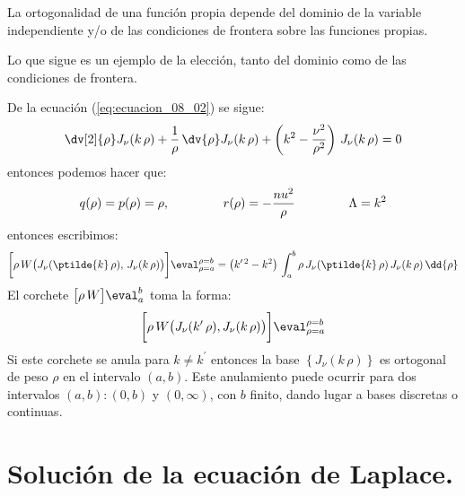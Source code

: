 La ortogonalidad de una función propia depende del dominio de la variable independiente y/o de las condiciones de frontera sobre las funciones propias.
\par
Lo que sigue es un ejemplo de la elección, tanto del dominio como de las condiciones de frontera.
\par
De la ecuación (\ref{eq:ecuacion_08_02}) se sigue:
\begin{align*}
\dv[2]{\rho} J_{\nu} (k \, \rho) + \dfrac{1}{\rho} \, \dv{\rho} J_{\nu} (k \, \rho) + \left( k^{2} - \dfrac{\nu^{2}}{\rho^{2}} \right) \, J_{\nu} (k \, \rho) = 0
\end{align*}
entonces podemos hacer que:
\begin{align*}
q(\rho) = p(\rho) = \rho, \hspace{1.5cm} r(\rho) = -\dfrac{nu^{2}}{\rho} \hspace{1.5cm} \Lambda = k^{2}
\end{align*}
entonces escribimos:
\begin{align}
\bigg[ \rho \, W \big( J_{\nu}(\ptilde{k} \, \rho), \, J_{\nu} (k \, \rho) \big) \bigg]\eval_{\rho=a}^{\rho=b} = \big( k^{\prime \, 2} - k^{2} \big) \, \int_{a}^{b} \rho \, J_{\nu}(\ptilde{k} \, \rho) \, J_{\nu} (k \, \rho) \, \dd{\rho}
\label{eq:ecuacion_08_12}
\end{align}
El corchete $\big[ \rho \, W \big]\eval_{a}^{b}$ toma la forma:
\begin{align*}
\bigg[ \rho \, W \big( J_{\nu}(k^{\prime} \, \rho), J_{\nu} (k \, \rho) \big) \bigg]\eval_{\rho=a}^{\rho=b}
\end{align*}
Si este corchete se anula para $k \neq k^{\prime}$ entonces la base $\left\{ J_{\nu} (k \, \rho) \right\}$ es ortogonal de peso $\rho$ en el intervalo $(a,b)$. Este anulamiento puede ocurrir para dos intervalos $(a,b): (0, b)$ y $(0, \infty)$, con $b$ finito, dando lugar a bases discretas o continuas.

\section{Solución de la ecuación de Laplace.}

